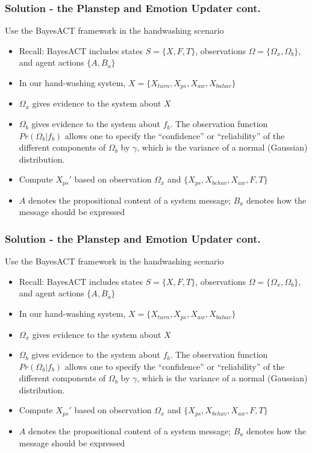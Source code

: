 \documentclass{beamer}
\begin{document}
\begin{frame}
\frametitle{Solution - the Planstep and Emotion Updater cont.}
Use the BayesACT framework in the handwashing scenario
\begin{itemize}
\item Recall: BayesACT includes states $S = \{X, F, T\}$, observations $\Omega = \{\Omega_{x}, \Omega_{b}\}$, and agent actions $\{A, B_{a}\}$
\pause \item In our hand-washing system, $X = \{X_{turn}, X_{ps}, X_{aw}, X_{bahav}\}$
\pause \item $\Omega_{x}$ gives evidence to the system about $X$
\pause \item $\Omega_{b}$ gives evidence to the system about $f_b$. The observation function $Pr(\Omega_b|f_b)$ allows one to specify the ``confidence'' or ``reliability'' of the different components of $\Omega_b$ by $\gamma$, which is the variance of a normal (Gaussian) distribution.
\pause \item Compute $X_{ps}'$ based on observation $\Omega_{x}$ and $\{X_{ps}, X_{behav}, X_{aw}, F, T\}$
\pause \item $A$ denotes the propositional content of a system message; $B_{a}$ denotes how the message should be expressed
\end{itemize}
\end{frame}

\begin{frame}
\frametitle{Solution - the Planstep and Emotion Updater cont.}
Use the BayesACT framework in the handwashing scenario
\begin{itemize}
\item Recall: BayesACT includes states $S = \{X, F, T\}$, observations $\Omega = \{\Omega_{x}, \Omega_{b}\}$, and agent actions $\{A, B_{a}\}$
\pause \item In our hand-washing system, $X = \{X_{turn}, X_{ps}, X_{aw}, X_{bahav}\}$
\pause \item $\Omega_{x}$ gives evidence to the system about $X$
\pause \item $\Omega_{b}$ gives evidence to the system about $f_b$. The observation function $Pr(\Omega_b|f_b)$ allows one to specify the ``confidence'' or ``reliability'' of the different components of $\Omega_b$ by $\gamma$, which is the variance of a normal (Gaussian) distribution.
\pause \item Compute $X_{ps}'$ based on observation $\Omega_{x}$ and $\{X_{ps}, X_{behav}, X_{aw}, F, T\}$
\pause \item $A$ denotes the propositional content of a system message; $B_{a}$ denotes how the message should be expressed
\end{itemize}
\end{frame}
\end{document}
